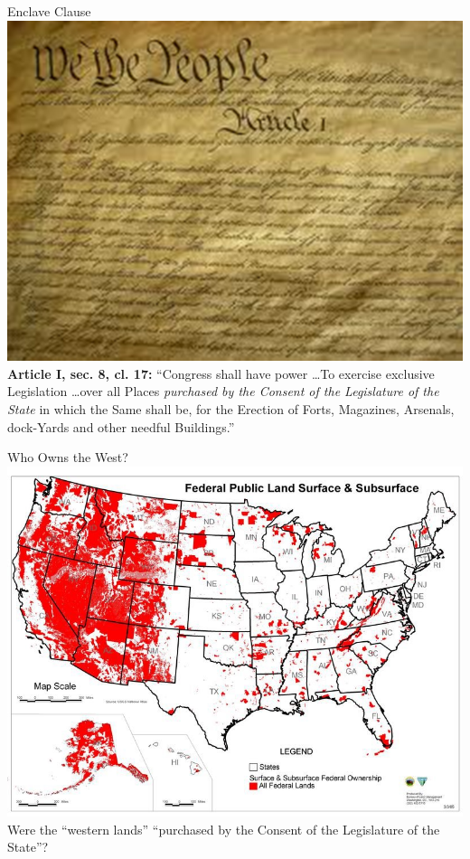 \begin{frame}{Enclave Clause}
   \centering
   \includegraphics[height=.6\textheight]{img/constitution.png} \\
   \textbf{Article I, sec. 8, cl. 17:} ``Congress shall have power \ldots To
   exercise exclusive Legislation \ldots over all Places \emph{purchased by the
   Consent of the Legislature of the State} in which the Same shall be, for the
   Erection of Forts, Magazines, Arsenals, dock-Yards and other needful
   Buildings.''
\end{frame}

\begin{frame}{Who Owns the West?}
    \centering
    \includegraphics[width=.7\textwidth]{img/federal-lands.png} \\
    \Large{Were the ``western lands'' ``purchased by the Consent of the Legislature of the State''?} \\
\end{frame}

